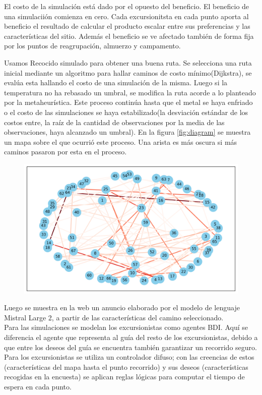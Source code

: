 \documentclass[10pt,twocolumn]{article}
\begin{document}
	 El costo de la simulaci\'on est\'a dado por el opuesto del beneficio. El beneficio de una simulacii\'on comienza en cero. Cada excursionitsta en cada punto aporta al beneficio el resultado de calcular el producto escalar entre sus preferencias y las caracter\'isticas del sitio. Adem\'as el beneficio se ve afectado tambi\'en de forma fija por los puntos de reagrupaci\'on, almuerzo y campamento. 
	 
	 Usamos Recocido simulado para obtener una buena ruta. Se selecciona una ruta inicial mediante un algoritmo para hallar caminos de costo m\'inimo(Dijkstra), se eval\'ua esta hallando el costo de una simulaci\'on de la misma. Luego si la temperatura no ha rebasado un umbral, se modifica la ruta acorde a lo planteado por la metaheur\'istica. Este proceso contin\'ua hasta que el metal se haya enfriado o el costo de las simulaciones se haya estabilizado(la desviaci\'on est\'andar de los costos entre, la ra\'iz de la cantidad de observaciones por la media de las observaciones, haya alcanzado un umbral). En la figura \ref{fig:diagram} se muestra un mapa sobre el que ocurri\'o este proceso. Una arista es m\'as oscura si m\'as caminos pasaron por esta en el proceso.
	 
		 \begin{figure}[h]
		 	\centering
		 	\includegraphics[width=\linewidth]{routes_stats.png}
		 	\caption{}
		 	\label{fig:routesstats}
		 \end{figure}
	
	 

	 
	 Luego se muestra en la web un anuncio elaborado por el modelo de lenguaje Mistral Large 2, a partir de las características del camino seleccionado.\\
	Para las simulaciones se modelan los excursionistas como agentes BDI. Aquí se diferencia el agente que representa al guía del resto de los excursionistas, debido a que entre los deseos del guía se encuentra también garantizar un recorrido seguro. Para los excursionistas se utiliza un controlador difuso; con las creencias de estos (características del mapa hasta el punto recorrido) y sus deseos (características recogidas en la encuesta) se aplican reglas l\'ogicas para computar el tiempo de espera en cada punto.
	
\end{document}
